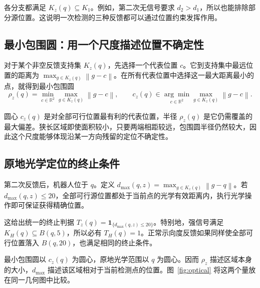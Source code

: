 \documentclass[UTF8,a4paper,zihao=-4,fontset=none]{ctexart}
\numberwithin{equation}{section}
\newcommand{\ind}{\mathbf 1}
\newcommand{\norm}[1]{\left\lVert#1\right\rVert}
\begin{document}
各分支都满足 \(K_z(q)\subseteq K_1\)。例如，第二次无信号要求 \(d_2>d_1\)，所以也能排除部分源位置。这说明一次检测的三种反馈都可以通过位置约束发挥作用。

\subsection{最小包围圆：用一个尺度描述位置不确定性}
对于某个非空反馈支持集 \(K_z(q)\)，先选择一个代表位置 \(c\)。它到支持集中最远位置的距离为 \(\max_{g\in K_z(q)}\norm{g-c}\)。在所有代表位置中选择这一最大距离最小的点，就得到最小包围圆
\begin{equation}\label{eq:mec}
\rho_z(q)=\min_{c\in\mathbb R^2}\max_{g\in K_z(q)}\norm{g-c},\qquad
c_z(q)\in\underset{c\in\mathbb R^2}{\arg\min}\max_{g\in K_z(q)}\norm{g-c}.
\end{equation}

圆心 \(c_z(q)\) 是对全部可行位置最有利的代表位置，半径 \(\rho_z(q)\) 是它仍需覆盖的最大偏差。狭长区域即使面积较小，只要两端相距较远，包围圆半径仍然较大，因此这个尺度能够体现沿某一方向残留的定位不确定性。

\subsection{原地光学定位的终止条件}
第二次反馈后，机器人位于 \(q\)。定义 \(d_{\max}(q,z)=\max_{g\in K_z(q)}\norm{g-q}\)。若 \(d_{\max}(q,z)\le20\)，全部可行源位置都处于当前点的光学有效距离内，执行光学操作即可保证获得精确位置。

这给出统一的终止判据 \(T_z(q)=\ind_{\{d_{\max}(q,z)\le20\}}\)。特别地，强信号满足 \(K_H(q)\subseteq B(q,5)\)，所以必有 \(T_H(q)=1\)。正常示向度反馈如果同样使全部可行位置落入 \(B(q,20)\)，也满足相同的终止条件。

最小包围圆以 \(c_z(q)\) 为圆心，原地光学范围以 \(q\) 为圆心。因而 \(\rho_z\) 描述区域本身的大小，\(d_{\max}\) 描述该区域相对于当前检测点的位置。图~\ref{fig:optical} 将这两个量放在同一几何图中比较。
\end{document}
